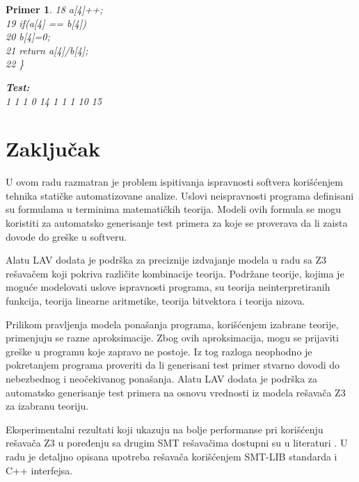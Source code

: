 \documentclass[12pt,oneside]{memoir}
\newcommand\tab[1][0.5cm]{\hspace*{#1}}
\newtheorem{primer}{Primer}
\begin{document}
\begin{primer}
\begin{minipage}[b]{0.5\textwidth}
18	\hspace{-0.08cm} \tab \tab	a[4]++; \\
19	\hspace{-0.08cm} \tab if(a[4] == b[4]) \\
20	\hspace{-0.08cm} \tab \tab	b[4]=0; \\
21	\hspace{-0.08cm} \tab return a[4]/b[4]; \\
22 \}
\end{minipage}
\hspace{1.1cm}
\begin{minipage}[t]{0.4\textwidth}
\vspace{-14.2cm}
\textbf{Test:}\\
1 1 1 0 14 1 1 1 10 15
\end{minipage}
\end{primer}



\chapter{Zaključak} \label{zakljucak}
U ovom radu razmatran je problem ispitivanja ispravnosti softvera korišćenjem tehnika statičke automatizovane analize. 
Uslovi neispravnosti programa definisani su formulama u terminima matematičkih teorija. Modeli ovih formula se mogu koristiti za automatsko generisanje test primera za koje se proverava da li zaista dovode do greške u softveru.
\par
Alatu LAV dodata je podrška za preciznije izdvajanje modela u radu sa Z3 rešavačem
koji pokriva različite kombinacije teorija. Podržane teorije, kojima je moguće modelovati uslove ispravnosti programa, su teorija neinterpretiranih funkcija, teorija linearne aritmetike,
teorija bitvektora i teorija nizova.

Prilikom pravljenja modela ponašanja programa, korišćenjem izabrane teorije,
primenjuju se razne aproksimacije. 
Zbog ovih aproksimacija, mogu se prijaviti greške u programu koje zapravo ne postoje. Iz tog razloga neophodno je pokretanjem
programa proveriti da li generisani test primer stvarno dovodi do nebezbednog i
neočekivanog ponašanja. Alatu LAV dodata je podrška za automatsko
generisanje test primera na osnovu vrednosti iz modela rešavača Z3 za izabranu
teoriju.
 
Eksperimentalni rezultati koji ukazuju na bolje performanse pri korišćenju rešavača Z3 u poređenju sa drugim SMT rešavačima dostupni su u literaturi \cite{z3improvements}. U radu je detaljno opisana upotreba rešavača korišćenjem SMT-LIB standarda i C++ interfejsa.
\end{document}
